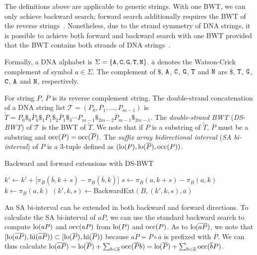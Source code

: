 \documentclass[webpdf,contemporary,large,namedate]{oup-authoring-template}%
\begin{document}
The definitions above are applicable to generic strings.
With one BWT, we can only achieve backward search;
forward search additionally requires the BWT of the reverse strings~\citep{DBLP:conf/bibm/LamLTWWY09}.
Nonetheless, due to the strand symmetry of DNA strings,
it is possible to achieve both forward and backward search with one BWT provided that the BWT contains both strands of DNA strings~\citep{Li:2012fk}.

Formally, a DNA alphabet is $\Sigma=\{{\tt A},{\tt C},{\tt G},{\tt T},{\tt N}\}$.
$\overline{a}$ denotes the Watson-Crick complement of symbol $a\in\Sigma$.
The complement of $\$$, ${\tt A}$, ${\tt C}$, ${\tt G}$, ${\tt T}$ and ${\tt N}$
are $\$$, ${\tt T}$, ${\tt G}$, ${\tt C}$, ${\tt A}$ and ${\tt N}$, respectively.

For string $P$, $\overline{P}$ is its reverse complement string.
The double-strand concatenation of a DNA string list $\mathcal{T}=(P_0,P_1,\ldots,P_{m-1})$ is
$\tilde{T}=P_0\$_0\overline{P}_0\$_1P_1\$_2\overline{P}_1\$_3\cdots P_{m-1}\$_{2m-2}\overline{P}_{m-1}\$_{2m-1}$.
The \emph{double-strand BWT} (\emph{DS-BWT}) of $\mathcal{T}$ is the BWT of $\tilde{T}$.
We note that if $P$ is a substring of $\tilde{T}$,
$\overline{P}$ must be a substring and ${\rm occ}(P)={\rm occ}(\overline{P})$.
The \emph{suffix array bidirectional interval} (\emph{SA bi-interval}) of $P$ is a 3-tuple defined as $({\rm lo}(P),{\rm lo}(\overline{P}),{\rm occ}(P))$.

\begin{algorithm}[tb]
	\caption{Backward and forward extensions with DS-BWT}\label{algo:backfor}
	\begin{algorithmic}[1]
				\State $k'\gets k'+\big[\pi_B(\overline{b},k+s)-\pi_B(\overline{b},k)\big]$
			\EndFor
			\State $s\gets \pi_B(a,k+s)-\pi_B(a,k)$
			\State $k\gets \pi_B(a,k)$
			\State {}
		\EndProcedure
			\State $(k',k,s)\gets${\sc BackwardExt}$(B,(k',k,s),\overline{a})$
			\State {}
		\EndProcedure
	\end{algorithmic}
\end{algorithm}

An SA bi-interval can be extended in both backward and forward directions.
To calculate the SA bi-interval of $aP$, we can use the standard backward search to compute ${\rm lo}(aP)$ and ${\rm occ}(aP)$ from ${\rm lo}(P)$ and ${\rm occ}(P)$.
As to ${\rm lo}(\overline{aP})$, we note that $[{\rm lo}(\overline{aP}),{\rm hi}(\overline{aP}))\subset[{\rm lo}(\overline{P}),{\rm hi}(\overline{P}))$
because $\overline{aP}=\overline{P}\circ\overline{a}$ is prefixed with $\overline{P}$.
We can thus calculate ${\rm lo}(\overline{aP})={\rm lo}(\overline{P})+\sum_{b<\overline{a}}{\rm occ}(\overline{P}b)={\rm lo}(\overline{P})+\sum_{b<\overline{a}}{\rm occ}(\overline{b}P)$.
\end{document}
